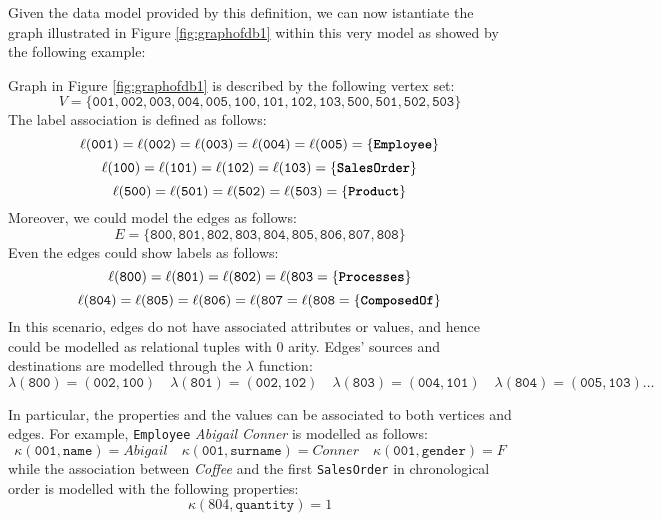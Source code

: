 Given the data model provided by this definition, we can now istantiate 
the graph illustrated in Figure \ref{fig:graphofdb1} within this very model as showed by the following example:

\begin{example}
Graph in Figure \ref{fig:graphofdb1} is described by the following vertex set:
\[V=\{\texttt{001},\texttt{002},\texttt{003},\texttt{004},\texttt{005},\texttt{100},\texttt{101},\texttt{102},\texttt{103},\texttt{500},\texttt{501},\texttt{502},\texttt{503}\}\]
The label association is defined as follows:
\[\ell(\texttt{001})=\ell(\texttt{002})=\ell(\texttt{003})=\ell(\texttt{004})=\ell(\texttt{005})=\{\texttt{\textbf{Employee}}\}\]
\[\ell(\texttt{100})=\ell(\texttt{101})=\ell(\texttt{102})=\ell(\texttt{103})=\{\texttt{\textbf{SalesOrder}}\}\]
\[\ell(\texttt{500})=\ell(\texttt{501})=\ell(\texttt{502})=\ell(\texttt{503})=\{\texttt{\textbf{Product}}\}\]
Moreover, we could model the edges as follows:
\[E=\{\texttt{800},\texttt{801},\texttt{802},\texttt{803},\texttt{804},\texttt{805},\texttt{806},\texttt{807},\texttt{808}\}\]
Even the edges could show labels as follows:
\[\ell(\texttt{800})=\ell(\texttt{801})=\ell(\texttt{802})=\ell(\texttt{803}=\{\textbf{\texttt{Processes}}\}\]
\[\ell(\texttt{804})=\ell(\texttt{805})=\ell(\texttt{806})=\ell(\texttt{807}=\ell(\texttt{808}=\{\textbf{\texttt{ComposedOf}}\}\]
In this scenario, edges do not have associated attributes or values, and hence could be modelled as relational tuples with $0$ arity. Edges' sources and destinations are modelled through the $\lambda$ function:
\[\lambda(\texttt{800})=(\texttt{002},\texttt{100})\quad \lambda(\texttt{801})=(\texttt{002},\texttt{102})\quad \lambda(\texttt{803})=(\texttt{004},\texttt{101})\quad \lambda(\texttt{804})=(\texttt{005},\texttt{103})\dots\]

In particular, the properties and the values can be associated to both vertices and edges. For example,  \texttt{Employee} \textit{Abigail Conner} is modelled as follows:
\[\kappa(\texttt{001},\texttt{name})=\textit{Abigail}\quad \kappa(\texttt{001},\texttt{surname})=\textit{Conner}\quad \kappa(\texttt{001},\texttt{gender})=\textit{F}\] 
while the association between \textit{Coffee} and the first \texttt{SalesOrder} in chronological order is modelled with the following properties:
\[\kappa(804,\texttt{quantity})=1\]

\end{example}


